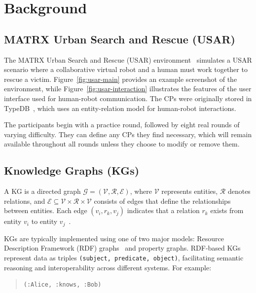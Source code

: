\documentclass[letterpaper]{article} %
\begin{document}
\section{Background}
\label{sec:background}

\subsection{MATRX Urban Search and Rescue (USAR)}
\label{sec:usar}


The MATRX Urban Search and Rescue (USAR) environment~\cite{matrx_2023,vanZoelen2021} simulates a USAR scenario where a collaborative virtual robot and a human must work together to rescue a victim. Figure~\ref{fig:usar-main} provides an example screenshot of the environment, while Figure~\ref{fig:usar-interaction} illustrates the features of the user interface used for human-robot communication. The CPs were originally stored in TypeDB~\cite{typeql2024}, which uses an entity-relation model for human-robot interactions. 

The participants begin with a practice round, followed by eight real rounds of varying difficulty. They can define any CPs they find necessary, which will remain available throughout all rounds unless they choose to modify or remove them.

\subsection{Knowledge Graphs (KGs)}
\label{sec:kg}

A KG is a directed graph $\mathcal{G} = (\mathcal{V}, \mathcal{R}, \mathcal{E})$, where $\mathcal{V}$ represents entities, $\mathcal{R}$ denotes relations, and $\mathcal{E} \subseteq \mathcal{V} \times \mathcal{R} \times \mathcal{V}$ consists of edges that define the relationships between entities. Each edge $(v_i, r_k, v_j)$ indicates that a relation $r_k$ exists from entity $v_i$ to entity $v_j$~\cite{10.1145/3447772}.

KGs are typically implemented using one of two major models: Resource Description Framework (RDF) graphs~\cite{Lanthaler:14:RCA} and property graphs. RDF-based KGs represent data as triples \texttt{(subject, predicate, object)}, facilitating semantic reasoning and interoperability across different systems. For example:

\begin{quote}
    \texttt{(:Alice, :knows, :Bob)}
\end{quote}
\end{document}

